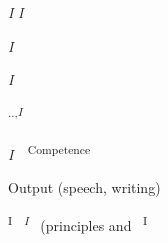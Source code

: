 \begin{multicols}{2}
\begin{styleStandard}
\textit{I}\textit{ }\textit{I}
\end{styleStandard}


\begin{styleStandard}
\textit{I}
\end{styleStandard}


\begin{center}
\begin{minipage}{0.0484in}
\begin{styleFramecontents}
\textit{I}
\end{styleFramecontents}


\end{minipage}
\end{center}
\begin{styleStandard}
\textsuperscript{{\textquotesingle}}{\textquotesingle}\textsuperscript{..}\textsuperscript{,}\textit{\textsuperscript{I}}\textit{\textsuperscript{\ \ }}\textit{\textsuperscript{ }}\textit{\textsuperscript{\ \ }}
\end{styleStandard}


\begin{styleStandard}
\textit{I\ \ }\textsuperscript{Competence}
\end{styleStandard}


\begin{styleStandard}
Output (speech, writing)
\end{styleStandard}


\end{multicols}
\begin{styleStandard}
\textsuperscript{I\ \ }\textit{\textsuperscript{I\ \ }}(principles and\textsuperscript{\ \ }\textsuperscript{I}
\end{styleStandard}


